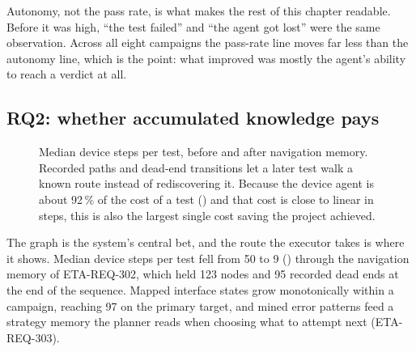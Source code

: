 Autonomy, not the pass rate, is what makes the rest of this chapter readable.
Before it was high, ``the test failed'' and ``the agent got lost'' were the
same observation. Across all eight campaigns the pass-rate line moves far less
than the autonomy line, which is the point: what improved was mostly the
agent's ability to reach a verdict at all.

\subsection{RQ2: whether accumulated knowledge pays}

\begin{figure}[htbp]
  \centering
  \caption[Effect of navigation memory on route length]{Median device steps per
  test, before and after navigation memory. Recorded paths and dead-end
  transitions let a later test walk a known route instead of rediscovering it.
  Because the device agent is about 92\,\% of the cost of a test
  () and that cost is close to linear in steps, this is also
  the largest single cost saving the project achieved.}
  \label{fig:steps}
\end{figure}

The graph is the system's central bet, and the route the executor takes is
where it shows. Median device steps per test fell from 50 to 9
() through the navigation memory of ETA-REQ-302, which held 123
nodes and 95 recorded dead ends at the end of the sequence. Mapped interface
states grow monotonically within a campaign, reaching 97 on the primary target,
and mined error patterns feed a strategy memory the planner reads when choosing
what to attempt next (ETA-REQ-303).

